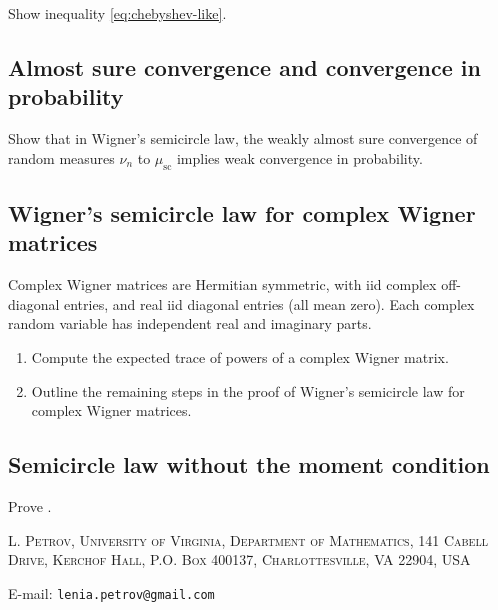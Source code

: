 \documentclass[letterpaper,11pt,oneside,reqno]{article}
\numberwithin{equation}{section}
\theoremstyle{definition}
\begin{document}
Show inequality \eqref{eq:chebyshev-like}.

\subsection{Almost sure convergence and convergence in probability}
\label{prob:almost-sure-convergence}

Show that in Wigner's semicircle law,
the weakly almost sure convergence
of random measures $\nu_n$ to $\mu_{\mathrm{sc}}$
implies weak convergence in probability.

\subsection{Wigner's semicircle law for complex Wigner matrices}
\label{prob:complex-wigner}

Complex Wigner matrices are Hermitian symmetric, with iid complex off-diagonal
entries, and real iid diagonal entries (all mean zero).
Each complex random variable has independent real and imaginary parts.

\begin{enumerate}
	\item Compute the expected trace of powers of a complex Wigner matrix.
	\item Outline the remaining steps in the proof of
		Wigner's semicircle law for complex Wigner matrices.
\end{enumerate}

\subsection{Semicircle law without the moment condition}
\label{prob:generalized-semicircle}

Prove .





\medskip

\textsc{L. Petrov, University of Virginia, Department of Mathematics, 141 Cabell Drive, Kerchof Hall, P.O. Box 400137, Charlottesville, VA 22904, USA}

E-mail: \texttt{lenia.petrov@gmail.com}
\end{document}
